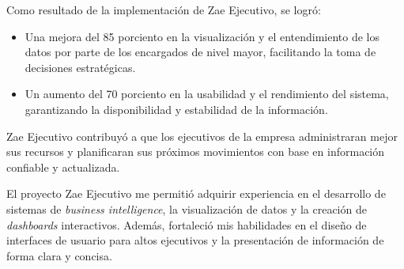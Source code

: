 \documentclass[protocolo.tex]{subfiles}
\begin{document}
Como resultado de la implementación de Zae Ejecutivo, se logró:

\begin{itemize}
\item Una mejora del 85 porciento en la visualización y el entendimiento de los datos por parte de los encargados de nivel mayor,  facilitando la toma de decisiones estratégicas.
\item Un aumento del 70 porciento en la usabilidad y el rendimiento del sistema,  garantizando la disponibilidad y estabilidad de la información.
\end{itemize}

Zae Ejecutivo  contribuyó a que los ejecutivos de la empresa administraran mejor sus recursos y  planificaran  sus  próximos  movimientos  con  base  en  información  confiable  y  actualizada.

El proyecto Zae Ejecutivo me permitió adquirir experiencia en el desarrollo de sistemas de  \textit{business intelligence},  la visualización de datos y la creación de  \textit{dashboards}  interactivos.  Además,  fortaleció  mis  habilidades  en  el  diseño  de  interfaces  de  usuario  para  altos  ejecutivos  y  la  presentación  de  información  de  forma  clara  y  concisa.
\end{document}
